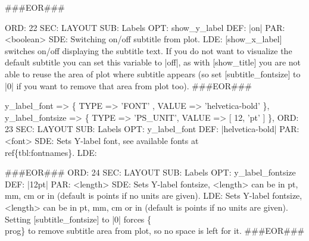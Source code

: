\documentclass[11pt]{article}
\def\nwendcode{\endtrivlist \endgroup} %
\let\nwdocspar=\par                    %
\begin{document}
###EOR###
\nwendcode{}\nwdocspar
\nwenddocs{}\plusendmoddef
ORD: 22
SEC: LAYOUT
SUB: Labels
OPT: show_y_label
DEF: |on|
PAR: <boolean>
SDE: Switching on/off subtitle from plot.
LDE: 
[show_x_label] switches on/off displaying the subtitle text. 
If you do not want to visualize the default subtitle you can set this
variable to |off|, as with [show_title] you are not able to reuse the area 
of plot where subtitle appears (so set [subtitle_fontsize] to |0| if you 
want to remove that area from plot too).
###EOR###
\nwendcode{}\nwdocspar
\nwenddocs{}\plusendmoddef
y_label_font               => \{ TYPE => 'FONT'   , VALUE => 'helvetica-bold' \},
y_label_fontsize           => \{ TYPE => 'PS_UNIT', VALUE => [ 12, 'pt' ]  \},
\eatline
{}\nwendcode{}\plusendmoddef
ORD: 23
SEC: LAYOUT
SUB: Labels
OPT: y_label_font
DEF: |helvetica-bold|
PAR: <font>
SDE: Sets Y-label font, see available fonts at~\\ref\{tbl:fontnames\}.
LDE: 

###EOR###
ORD: 24
SEC: LAYOUT
SUB: Labels
OPT: y_label_fontsize
DEF: |12pt|
PAR: <length>
SDE: Sets Y-label fontsize, <length> can be in pt, mm, cm or in (default is points if no units are given).
LDE:
Sets Y-label fontsize, <length> can be in pt, mm, cm or in 
(default is points if no units are given).
Setting [subtitle_fontsize] to |0| forces \{\\prog\} to remove
subtitle area from plot, so no space is left for it.
###EOR###
\nwendcode{}\nwdocspar
\end{document}
